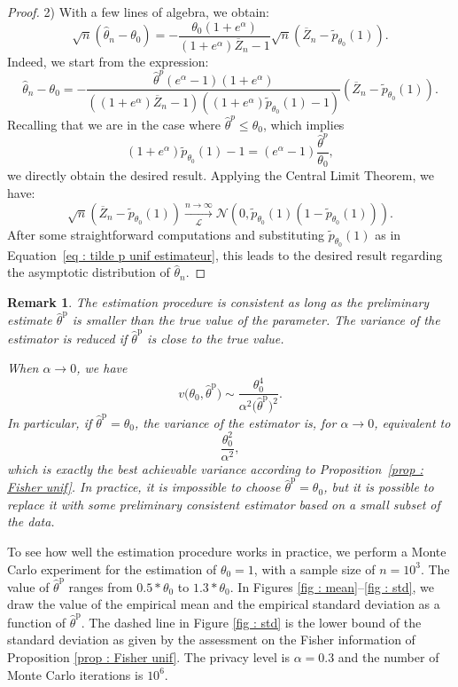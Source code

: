 \documentclass[a4paper, 11pt]{article}
\newtheorem{rem}{Remark}
\theoremstyle{definition}
\begin{document}
{\begin{proof}
 2) With a few lines of algebra, we obtain:
\[
\sqrt{n}\left(\widehat{\theta}_n - \theta_0\right) = - \frac{\theta_0 (1 + e^\alpha)}{(1 + e^\alpha)\overline{Z}_n - 1} \sqrt{n}\left(\overline{Z}_n - \widetilde{p}_{\theta_0}(1)\right).
\]
Indeed, we start from the expression:
\[
\widehat{\theta}_n - \theta_0 = - \frac{\hat{\theta}^p (e^\alpha - 1)(1 + e^\alpha)}{\left((1 + e^\alpha)\overline{Z}_n - 1\right)\left((1 + e^\alpha)\widetilde{p}_{\theta_0}(1) - 1\right)} \left( \overline{Z}_n - \widetilde{p}_{\theta_0}(1) \right).
\]
Recalling that we are in the case where \( \hat{\theta}^p \leq \theta_0 \), which implies
\[
(1 + e^\alpha)\widetilde{p}_{\theta_0}(1) - 1 = (e^\alpha - 1) \frac{\hat{\theta}^p}{\theta_0},
\]
we directly obtain the desired result. Applying the Central Limit Theorem, we have:
\[
\sqrt{n} \left( \overline{Z}_n - \widetilde{p}_{\theta_0}(1) \right) \xrightarrow[\mathcal{L}]{n \to \infty} \mathcal{N} \left( 0, \widetilde{p}_{\theta_0}(1)\left(1 - \widetilde{p}_{\theta_0}(1)\right) \right).
\]
After some straightforward computations and substituting \( \widetilde{p}_{\theta_0}(1) \) as in Equation~\eqref{eq : tilde p unif estimateur}, this leads to the desired result regarding the asymptotic distribution of \( \widehat{\theta}_n \).
 \end{proof}
\begin{rem} 	
The estimation procedure is consistent as long as the preliminary estimate $\widehat{\theta}^{\text{p}}$ is smaller than the true value of the parameter. The variance of the estimator is reduced if $\widehat{\theta}^{\text{p}}$ is close to the true value.  

When $\alpha \to 0$, we have
\[
v\bigl(\theta_0,\widehat{\theta}^{\text{p}}\bigr) \sim 
\frac{\theta_0^4}{\alpha^2 \bigl(\widehat{\theta}^{\text{p}}\bigr)^2}.
\]
In particular, if $\widehat{\theta}^{\text{p}} = \theta_0$, the variance of the estimator is, for $\alpha \to 0$, equivalent to 
\[
\frac{\theta_0^2}{\alpha^2},
\]
which is exactly the best achievable variance according to Proposition~\ref{prop : Fisher unif}. In practice, it is impossible to choose $\widehat{\theta}^{\text{p}} = \theta_0$, but it is possible to replace it with some preliminary consistent estimator based on a small subset of the data.
\end{rem}

To see how well the estimation procedure works in practice, we perform a Monte Carlo experiment for the estimation of $\theta_0=1$, with a sample size of $n=10^3$. The value of $\widehat{\theta}^{\text{p}}$ ranges from $0.5* \theta_0$ to $1.3*\theta_0$. 
In Figures \ref{fig : mean}--\ref{fig : std}, we draw the value of the empirical mean and the empirical standard deviation as a function of $\widehat{\theta}^{\text{p}}$. The dashed line in
Figure \ref{fig : std} is the lower bound of the standard deviation as given by the assessment on the Fisher information of Proposition \ref{prop : Fisher unif}. The privacy level is $\alpha=0.3$ and the number of Monte Carlo iterations is $10^6$.

}
\end{document}
